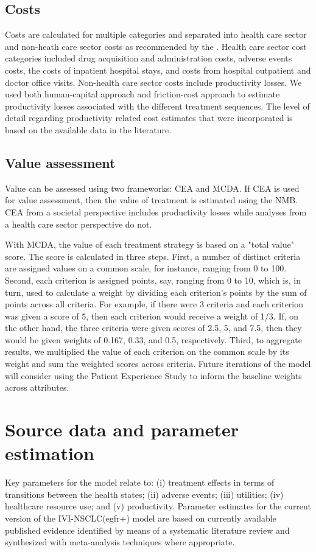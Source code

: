 \documentclass[11pt,final,fleqn]{article}\usepackage[]{graphicx}\usepackage[]{color}
\theoremstyle{plain}
\begin{document}
{\subsection{Costs} 
Costs are calculated for multiple categories and separated into health care sector and non-heath care sector costs as recommended by the \citet{sanders2016recommendations}. Health care sector cost categories included drug acquisition and administration costs, adverse events costs, the costs of inpatient hospital stays, and costs from hospital outpatient and doctor office visits. Non-health care sector costs include productivity losses. We used both human-capital approach and friction-cost approach to estimate productivity losses associated with the different treatment sequences. The level of detail regarding productivity related cost estimates that were incorporated is based on the available data in the literature.

\subsection{Value assessment} 
Value can be assessed using two frameworks: CEA and MCDA. If CEA is used for value assessment, then the value of treatment is estimated using the NMB. CEA from a societal perspective includes productivity losses while analyses from a health care sector perspective do not.

With MCDA, the value of each treatment strategy is based on a "total value" score. The score is calculated in three steps. First, a number of distinct criteria are assigned values on a common scale, for instance, ranging from 0 to 100. Second, each criterion is assigned points, say, ranging from 0 to 10, which is, in turn, used to calculate a weight by dividing each criterion's points by the sum of points across all criteria. For example, if there were 3 criteria and each criterion was given a score of 5, then each criterion would receive a weight of 1/3. If, on the other hand, the three criteria were given scores of 2.5, 5, and 7.5, then they would be given weights of 0.167, 0.33, and 0.5, respectively. Third, to aggregate results, we multiplied the value of each criterion on the common scale by its weight and sum the weighted scores across criteria. Future iterations of the model will consider using the Patient Experience Study to inform the baseline weights across attributes. 


\section{Source data and parameter estimation}\label{sec:data}
Key parameters for the model relate to: (i) treatment effects in terms of transitions between the health states; (ii) adverse events; (iii) utilities; (iv) healthcare resource use; and (v) productivity. Parameter estimates for the current version of the IVI-NSCLC(egfr+) model are based on currently available published evidence identified by means of a systematic literature review and synthesized with meta-analysis techniques where appropriate. 

}
\end{document}
